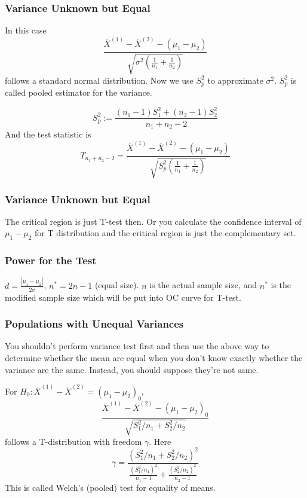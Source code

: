 \documentclass{beamer}
\begin{document}
\begin{frame}
    \frametitle{Variance Unknown but Equal}

    In this case 
    \[\frac{\overline{X}^{(1)}-\overline{X}^{(2)}-(\mu_1-\mu_2)}{\sqrt{\sigma^2(\frac{1}{n_1}+\frac{1}{n_2})}}\]
    follows a standard normal distribution. Now we use $S_p^2$ to approximate $\sigma^2$. $S_p^2$ is called pooled estimator for the variance.\par
    \[S_p^2 :=\frac{(n_1-1)S_1^2+(n_2-1)S_2^2}{n_1+n_2-2}\]
    And the test statistic is 
    \[T_{n_1+n_2-2}=\frac{\overline{X}^{(1)}-\overline{X}^{(2)}-(\mu_1-\mu_2)}{\sqrt{S_{p}^2(\frac{1}{n_1}+\frac{1}{n_2})}}\]

\end{frame}

\begin{frame}
    \frametitle{Variance Unknown but Equal}
    The critical region is just T-test then. Or you calculate the confidence interval of $\mu_1-\mu_2$ for T distribution and the critical region is just the complementary set.
    
\end{frame}

\begin{frame}
    \frametitle{Power for the Test}

    $d=\frac{|\mu_1-\mu_2|}{2\sigma}$, $n^{*}=2n-1$ (equal size). $n$ is the actual sample size, and $n^{*}$ is the modified sample size which will be put into OC curve for T-test.

\end{frame}

\begin{frame}
    \frametitle{Populations with Unequal Variances}

    You shouldn't perform variance test first and then use the above way to determine whether the mean are equal when you don't know exactly whether the variance are the same. Instead, you should suppose they're not same.\par

    For $H_0: \overline{X}^{(1)}-\overline{X}^{(2)}=(\mu_1 - \mu_2)_0$, 
    \[\frac{\overline{X}^{(1)}-\overline{X}^{(2)}-(\mu_1-\mu_2)_0}{\sqrt{S_1^2/n_1+S_2^2/n_2}}\]
    follows a T-distribution with freedom $\gamma$. Here
    \[\gamma=\frac{(S_1^2/n_1+S_2^2/n_2)^2}{\frac{(S_1^2/n_1)^2}{n_1-1}+\frac{(S_2^2/n_2)^2}{n_2-1}}\]
    This is called Welch's (pooled) test for equality of means.

\end{frame}
\end{document}
